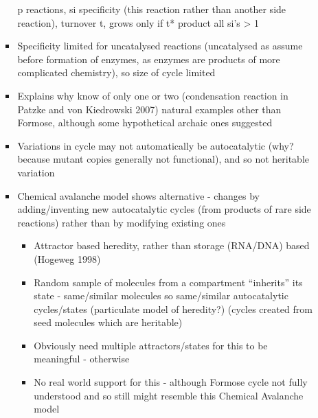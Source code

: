 \begin{itemize}
\begin{itemize}
\begin{itemize}
					p reactions, si specificity (this reaction rather than another
					side reaction), turnover t, grows only if t* product all si's
					\textgreater{} 1
					
					\item
					
					Specificity limited for uncatalysed reactions (uncatalysed as
					assume before formation of enzymes, as enzymes are products of
					more complicated chemistry), so size of cycle limited
					
					\item
					
					Explains why know of only one or two (condensation reaction in
					Patzke and von Kiedrowski 2007) natural examples other than
					Formose, although some hypothetical archaic ones suggested
					
					\item
					
					Variations in cycle may not automatically be autocatalytic (why?
					because mutant copies generally not functional), and so not
					heritable variation
					
					\item
					
					Chemical avalanche model shows alternative - changes by
					adding/inventing new autocatalytic cycles (from products of rare
					side reactions) rather than by modifying existing ones
					
					
					\begin{itemize}
						\item
						
						Attractor based heredity, rather than storage (RNA/DNA) based
						(Hogeweg 1998)
						
						\item
						
						Random sample of molecules from a compartment ``inherits'' its
						state - same/similar molecules so same/similar autocatalytic
						cycles/states (particulate model of heredity?) (cycles created
						from seed molecules which are heritable)
						
						\item
						
						Obviously need multiple attractors/states for this to be
						meaningful - otherwise
						
						\item
						
						No real world support for this - although Formose cycle not
						fully understood and so still might resemble this Chemical
						Avalanche model
						

\end{itemize}
\end{itemize}
\end{itemize}
\end{itemize}
